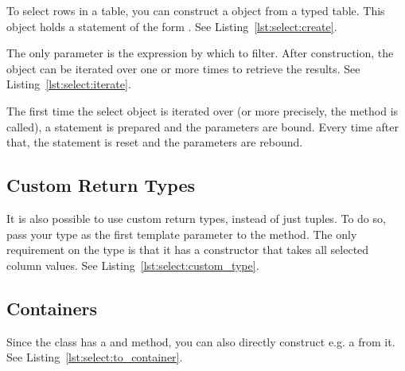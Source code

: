 To select rows in a table, you can construct a  object from a typed table. This object holds a statement of the form \newline {}. See Listing~\ref{lst:select:create}.



The only parameter is the expression by which to filter. After construction, the object can be iterated over one or more times to retrieve the results. See Listing~\ref{lst:select:iterate}.



The first time the select object is iterated over (or more precisely, the  method is called), a statement is prepared and the parameters are bound. Every time after that, the statement is reset and the parameters are rebound.

\subsection{Custom Return Types}
\label{section:select:custom}

It is also possible to use custom return types, instead of just tuples. To do so, pass your type as the first template parameter to the  method. The only requirement on the type is that it has a constructor that takes all selected column values. See Listing~\ref{lst:select:custom_type}.



\subsection{Containers}
\label{section:select:container}

Since the  class has a  and  method, you can also directly construct e.g. a  from it. See Listing~\ref{lst:select:to_container}.


